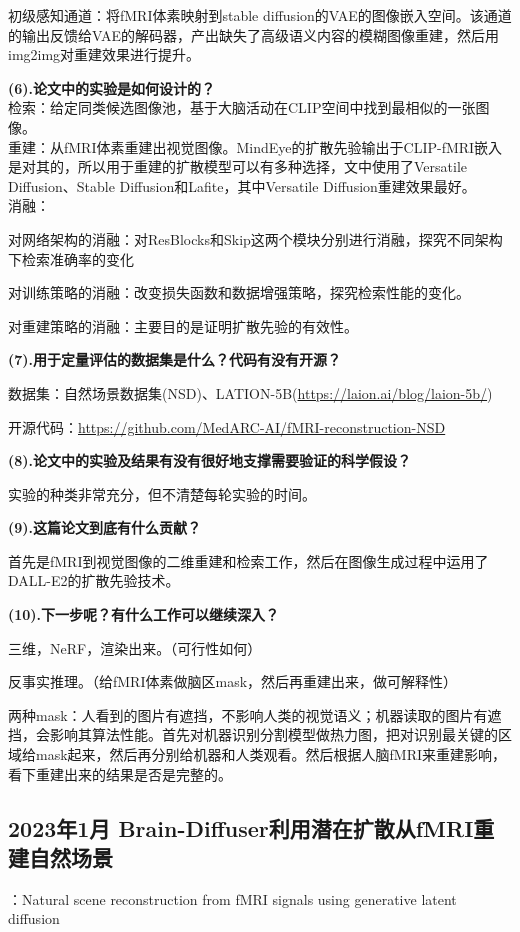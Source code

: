 \documentclass[12pt, a4paper, oneside]{ctexart}
\begin{document}
    初级感知通道：将fMRI体素映射到stable diffusion的VAE的图像嵌入空间。该通道的输出反馈给VAE的解码器，产出缺失了高级语义内容的模糊图像重建，然后用img2img对重建效果进行提升。

    \noindent\textbf{(6).论文中的实验是如何设计的？}\\
    检索：给定同类候选图像池，基于大脑活动在CLIP空间中找到最相似的一张图像。\\
    重建：从fMRI体素重建出视觉图像。MindEye的扩散先验输出于CLIP-fMRI嵌入是对其的，所以用于重建的扩散模型可以有多种选择，文中使用了Versatile Diffusion、Stable Diffusion和Lafite，其中Versatile Diffusion重建效果最好。\\
    消融：

    对网络架构的消融：对ResBlocks和Skip这两个模块分别进行消融，探究不同架构下检索准确率的变化

    对训练策略的消融：改变损失函数和数据增强策略，探究检索性能的变化。

    对重建策略的消融：主要目的是证明扩散先验的有效性。

    \noindent\textbf{(7).用于定量评估的数据集是什么？代码有没有开源？}

    数据集：自然场景数据集(NSD)\cite{Allen2022}、LATION-5B(\url{https://laion.ai/blog/laion-5b/})

    开源代码：\url{https://github.com/MedARC-AI/fMRI-reconstruction-NSD}

    \noindent\textbf{(8).论文中的实验及结果有没有很好地支撑需要验证的科学假设？}

    实验的种类非常充分，但不清楚每轮实验的时间。

    \noindent\textbf{(9).这篇论文到底有什么贡献？}

    首先是fMRI到视觉图像的二维重建和检索工作，然后在图像生成过程中运用了DALL-E2的扩散先验技术。

    \noindent\textbf{(10).下一步呢？有什么工作可以继续深入？}

    三维，NeRF，渲染出来。（可行性如何）

    反事实推理。（给fMRI体素做脑区mask，然后再重建出来，做可解释性）

    两种mask：人看到的图片有遮挡，不影响人类的视觉语义；机器读取的图片有遮挡，会影响其算法性能。首先对机器识别分割模型做热力图，把对识别最关键的区域给mask起来，然后再分别给机器和人类观看。然后根据人脑fMRI来重建影响，看下重建出来的结果是否是完整的。

    \subsection{2023年1月 Brain-Diffuser利用潜在扩散从fMRI重建自然场景\cite{ozcelik2023natural}}
    ：Natural scene reconstruction from fMRI signals using generative latent diffusion
\end{document}
